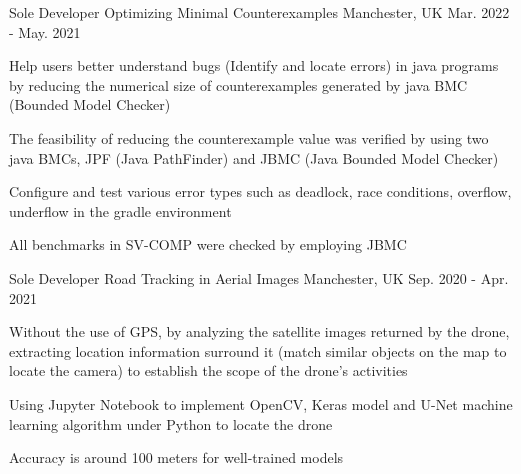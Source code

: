\begin{cventries}

  \cventry
    {Sole Developer} %
    {Optimizing Minimal Counterexamples} %
    {Manchester, UK} %
    {Mar. 2022 - May. 2021} %
    {
      \begin{cvitems} %
        \item {Help users better understand bugs (Identify and locate errors) in java programs by reducing the numerical size of counterexamples generated by java BMC (Bounded Model Checker)}
        \item {The feasibility of reducing the counterexample value was verified by using two java BMCs, JPF (Java PathFinder) and JBMC (Java Bounded Model Checker)}
        \item {Configure and test various error types such as deadlock, race conditions, overflow, underflow in the gradle environment}
        \item {All benchmarks in SV-COMP were checked by employing JBMC}
      \end{cvitems}
    }

  \cventry
    {Sole Developer} %
    {Road Tracking in Aerial Images} %
    {Manchester, UK} %
    {Sep. 2020 - Apr. 2021} %
    {
      \begin{cvitems} %
        \item {Without the use of GPS, by analyzing the satellite images returned by the drone, extracting location information surround it (match similar objects on the map to locate the camera) to establish the scope of the drone's activities}
        \item {Using Jupyter Notebook to implement OpenCV, Keras model and U-Net machine learning algorithm under Python to locate the drone}
        \item {Accuracy is around 100 meters for well-trained models}
      \end{cvitems}
    }


\end{cventries}
